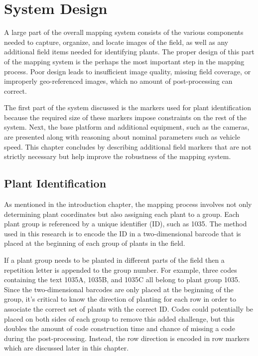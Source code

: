 
\cleardoublepage

\chapter{System Design}
\label{chapter:system_design}

A large part of the overall mapping system consists of the various components needed to capture, organize, and locate images of the field, as well as any additional field items needed for identifying plants.  The proper design of this part of the mapping system is the perhaps the most important step in the mapping process.  Poor design leads to insufficient image quality, missing field coverage, or improperly geo-referenced images, which no amount of post-processing can correct.  

The first part of the system discussed is the markers used for plant identification because the required size of these markers impose constraints on the rest of the system.  Next, the base platform and additional equipment, such as the cameras, are presented along with reasoning about nominal parameters such as vehicle speed.  This chapter concludes by describing additional field markers that are not strictly necessary but help improve the robustness of the mapping system. 

\section{Plant Identification}
\label{section:plantid}

As mentioned in the introduction chapter, the mapping process involves not only determining plant coordinates but also assigning each plant to a group.  Each plant group is referenced by a unique identifier (ID), such as 1035.  The method used in this research is to encode the ID in a two-dimensional barcode that is placed at the beginning of each group of plants in the field. 

If a plant group needs to be planted in different parts of the field then a repetition letter is appended to the group number.  For example, three codes containing the text 1035A, 1035B, and 1035C all belong to plant group 1035.  Since the two-dimensional barcodes are only placed at the beginning of the group, it's critical to know the direction of planting for each row in order to associate the correct set of plants with the correct ID.  Codes could potentially be placed on both sides of each group to remove this added challenge, but this doubles the amount of code construction time and chance of missing a code during the post-processing.  Instead, the row direction is encoded in row markers which are discussed later in this chapter.

